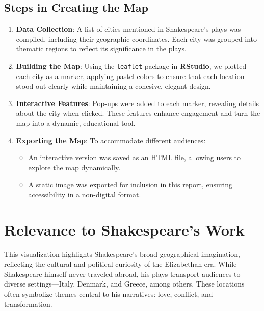 \documentclass[a4paper,12pt]{article}
\begin{document}
\subsection*{Steps in Creating the Map}

\begin{enumerate}[label=\textcolor{shakespeareblue}{\textbf{\arabic*.}}]
    \item \textbf{Data Collection}: A list of cities mentioned in Shakespeare's plays was compiled, including their geographic coordinates. Each city was grouped into thematic regions to reflect its significance in the plays.
    
    \item \textbf{Building the Map}: Using the \texttt{leaflet} package in \textbf{RStudio}, we plotted each city as a marker, applying pastel colors to ensure that each location stood out clearly while maintaining a cohesive, elegant design.

    \item \textbf{Interactive Features}: Pop-ups were added to each marker, revealing details about the city when clicked. These features enhance engagement and turn the map into a dynamic, educational tool.

    \item \textbf{Exporting the Map}: To accommodate different audiences:
    \begin{itemize}[label=\textcolor{shakespeareyellow}{\textbullet}]
        \item An interactive version was saved as an HTML file, allowing users to explore the map dynamically.
        \item A static image was exported for inclusion in this report, ensuring accessibility in a non-digital format.
    \end{itemize}
\end{enumerate}

\newpage

\section*{\color{shakespeareblue}Relevance to Shakespeare’s Work}
This visualization highlights Shakespeare’s broad geographical imagination, reflecting the cultural and political curiosity of the Elizabethan era. While Shakespeare himself never traveled abroad, his plays transport audiences to diverse settings—Italy, Denmark, and Greece, among others. These locations often symbolize themes central to his narratives: love, conflict, and transformation.
\end{document}

